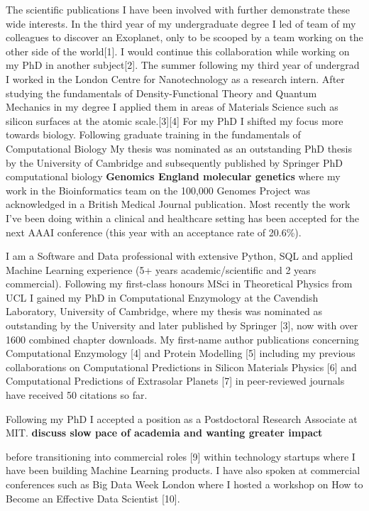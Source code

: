 \documentclass[11pt,a4paper,sans]{moderncv}        %
\begin{document}
The scientific publications I have been involved with further
demonstrate these wide interests. 
In the third year of my undergraduate degree I led of team of my colleagues to discover an Exoplanet, only to be scooped by a team working on the other side of the world[1]. I would continue this collaboration while working on my PhD in another subject[2]. The summer following my third year of undergrad I worked in the London Centre for Nanotechnology as a research intern. After studying the fundamentals of Density-Functional Theory and Quantum Mechanics in my degree I applied them in areas of Materials Science such as silicon surfaces at the atomic scale.[3][4]
%
For my PhD I shifted my focus more towards biology. Following graduate training in the fundamentals of Computational Biology 
My thesis was nominated as an outstanding PhD thesis by the University of Cambridge and subsequently published by Springer
%
PhD computational biology 
%
\textbf{Genomics England molecular genetics}
where my work in the Bioinformatics team 
on the 100,000 Genomes Project was 
acknowledged in a British Medical Journal publication.
\cite{gel_bmj}
%
%
Most recently the work I've been doing within a clinical 
and healthcare setting has been accepted for the next 
AAAI conference 
(this year with an acceptance rate of 20.6\%).\cite{conan}
%
%



I am a Software and Data professional with extensive Python, SQL and applied Machine Learning experience (5+ years academic/scientific and 2 years commercial). Following my first-class honours MSci in Theoretical Physics from UCL I gained my PhD in Computational Enzymology at the Cavendish Laboratory, University of Cambridge, where my thesis was nominated as outstanding by the University and later published by Springer [3], now with over 1600 combined chapter downloads. My first-name author publications concerning Computational Enzymology [4] and Protein Modelling [5] including my previous collaborations on Computational Predictions in Silicon Materials Physics [6] and Computational Predictions of Extrasolar Planets [7] in peer-reviewed journals have received 50 citations so far.

Following my PhD I accepted a position as a 
Postdoctoral Research Associate at MIT\cite{mit}. 
\textbf{discuss slow pace of academia and wanting greater 
impact}

before transitioning into commercial roles [9] within technology startups where I have been building Machine Learning products. I have also spoken at commercial conferences such as Big Data Week London where I hosted a workshop on How to Become an Effective Data Scientist [10].
\end{document}
